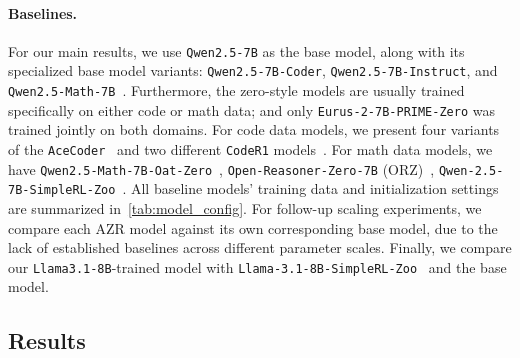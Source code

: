 \documentclass{article}
\begin{document}
\paragraph{Baselines.}
For our main results, we use \texttt{Qwen2.5-7B} as the base model, along with its specialized base model variants: \texttt{Qwen2.5-7B-Coder}, \texttt{Qwen2.5-7B-Instruct}, and \texttt{Qwen2.5-Math-7B}~\citep{yang2024qwen2,DBLP:journals/corr/abs-2409-12186,DBLP:journals/corr/abs-2409-12122}. Furthermore, the zero-style models are usually trained specifically on either code or math data; and only \texttt{Eurus-2-7B-PRIME-Zero}\citep{cui2025process} was trained jointly on both domains. For code data models, we present four variants of the \texttt{AceCoder}~\citep{zeng2025acecoder} and two different \texttt{CodeR1} models~\citep{code-r1}. For math data models, we have \texttt{Qwen2.5-Math-7B-Oat-Zero}~\citep{liu2025understanding}, \texttt{Open-Reasoner-Zero-7B} (ORZ)~\citep{hu2025open}, \texttt{Qwen-2.5-7B-SimpleRL-Zoo}~\citep{zeng2025simplerl}. All baseline models' training data and initialization settings are summarized in~\cref{tab:model_config}. For follow-up scaling experiments, we compare each AZR model against its own corresponding base model, due to the lack of established baselines across different parameter scales. Finally, we compare our \texttt{Llama3.1-8B}-trained model with \texttt{Llama-3.1-8B-SimpleRL-Zoo}~\citep{zeng2025simplerl} and the base model.

\subsection{Results}
\end{document}
